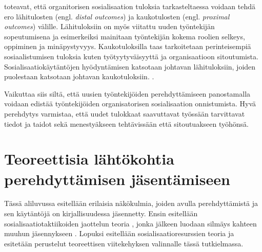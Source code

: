 \documentclass[utf8]{gradu3}
\begin{document}
\textcite{saks-gruman-2012} toteavat, että organitorisen sosialisaation tuloksia tarkasteltaessa voidaan tehdä ero lähitulosten (engl. \textit{distal outcomes}) ja kaukotulosten (engl. \textit{proximal outcomes}) välille. Lähituloksiin on myös viitattu uuden työntekijän sopeutumisena ja esimerkeiksi mainitaan työntekijän kokema roolien selkeys, oppiminen ja minäpystyvyys. Kaukotuloksilla taas tarkoitetaan perinteisempiä sosiaalistumisen tuloksia kuten työtyytyväisyyttä ja organisaatioon sitoutumista. Sosialisaatiokäytäntöjen hyödyntämisen katsotaan johtavan lähituloksiin, joiden puolestaan katsotaan johtavan kaukotuloksiin. \parencite{saks-gruman-2012}.

Vaikuttaa siis siltä, että uusien työntekijöiden perehdyttämiseen panostamalla voidaan edistää työntekijöiden organisatorisen sosialisaation onnistumista. Hyvä perehdytys varmistaa, että uudet tulokkaat saavuttavat työssään tarvittavat tiedot ja taidot sekä menestyäkseen tehtävissään että sitoutuakseen työhönsä.


\section{Teoreettisia lähtökohtia perehdyttämisen jäsentämiseen}
\label{luku-teoreettisia-lähestymistapoja-perehdyttämiseen}

Tässä aliluvussa esitellään erilaisia näkökulmia, joiden avulla perehdyttämistä ja sen käytäntöjä on kirjallisuudessa jäsennetty. Ensin esitellään sosialisaatiotaktiikoiden jaottelun teoria \parencite{van-maanen-schein-1979}, jonka jälkeen luodaan silmäys kahteen muuhun jäsennykseen \parencite{bauer-2010}. Lopuksi esitellään sosialisaatioresurssien teoria \parencite{saks-gruman-2012} ja esitetään perustelut teoreettisen viitekehyksen valinnalle tässä tutkielmassa.
\end{document}
